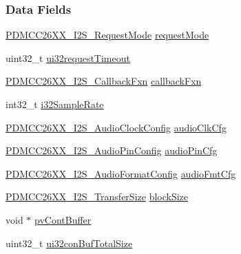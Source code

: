 \subsubsection*{Data Fields}
\begin{DoxyCompactItemize}
\item 
\hyperlink{_p_d_m_c_c26_x_x__util_8h_aef896b2a7fc07d3b145f8d02eaa9e377}{P\+D\+M\+C\+C26\+X\+X\+\_\+\+I2\+S\+\_\+\+Request\+Mode} \hyperlink{struct_p_d_m_c_c26_x_x___i2_s___object_a075b678ddb1fa9546ada194fb0ea95be}{request\+Mode}
\item 
uint32\+\_\+t \hyperlink{struct_p_d_m_c_c26_x_x___i2_s___object_aeb1eef41ef878b01eb9d80a5522e9f02}{ui32request\+Timeout}
\item 
\hyperlink{_p_d_m_c_c26_x_x__util_8h_a82786f08d1b22895c79dcd8880fb92f3}{P\+D\+M\+C\+C26\+X\+X\+\_\+\+I2\+S\+\_\+\+Callback\+Fxn} \hyperlink{struct_p_d_m_c_c26_x_x___i2_s___object_ae12dc32ac991175a4f08515d752ac325}{callback\+Fxn}
\item 
int32\+\_\+t \hyperlink{struct_p_d_m_c_c26_x_x___i2_s___object_a72d15d18ea6b70661cd13ec087cecfe1}{i32\+Sample\+Rate}
\item 
\hyperlink{struct_p_d_m_c_c26_x_x___i2_s___audio_clock_config}{P\+D\+M\+C\+C26\+X\+X\+\_\+\+I2\+S\+\_\+\+Audio\+Clock\+Config} \hyperlink{struct_p_d_m_c_c26_x_x___i2_s___object_af265891596f047a7afec3b74de172d29}{audio\+Clk\+Cfg}
\item 
\hyperlink{union_p_d_m_c_c26_x_x___i2_s___audio_pin_config}{P\+D\+M\+C\+C26\+X\+X\+\_\+\+I2\+S\+\_\+\+Audio\+Pin\+Config} \hyperlink{struct_p_d_m_c_c26_x_x___i2_s___object_a264fc107af3d9f75af4d16a4725a0d84}{audio\+Pin\+Cfg}
\item 
\hyperlink{struct_p_d_m_c_c26_x_x___i2_s___audio_format_config}{P\+D\+M\+C\+C26\+X\+X\+\_\+\+I2\+S\+\_\+\+Audio\+Format\+Config} \hyperlink{struct_p_d_m_c_c26_x_x___i2_s___object_a51f2f3fb525d8d95a5b8aeb77891bfed}{audio\+Fmt\+Cfg}
\item 
\hyperlink{_p_d_m_c_c26_x_x__util_8h_a5b4e6b7c39c913bc6ae97261a5f2a226}{P\+D\+M\+C\+C26\+X\+X\+\_\+\+I2\+S\+\_\+\+Transfer\+Size} \hyperlink{struct_p_d_m_c_c26_x_x___i2_s___object_aeb8afba6106515f9c369fc7a8e0221a2}{block\+Size}
\item 
void $\ast$ \hyperlink{struct_p_d_m_c_c26_x_x___i2_s___object_a71846a6995a34ba716f284596e37e47c}{pv\+Cont\+Buffer}
\item 
uint32\+\_\+t \hyperlink{struct_p_d_m_c_c26_x_x___i2_s___object_a72101e63cbac40e6ca3f9ce88d6c8a43}{ui32con\+Buf\+Total\+Size}
\item 

\end{DoxyCompactItemize}
